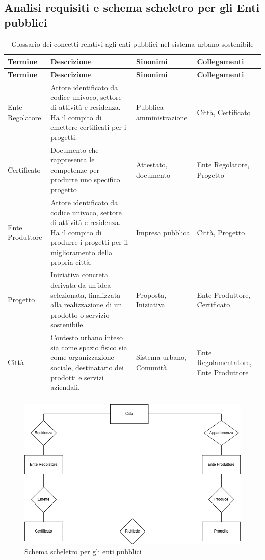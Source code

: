 \documentclass{article}
\begin{document}

\newpage
\subsection{Analisi requisiti e schema scheletro per gli Enti pubblici}

\begin{longtable}{|p{3cm}|p{6.5cm}|p{2.5cm}|p{3cm}|}
\hline
\textbf{Termine} & \textbf{Descrizione} & \textbf{Sinonimi} & \textbf{Collegamenti} \\
\hline
\endfirsthead

\hline
\textbf{Termine} & \textbf{Descrizione} & \textbf{Sinonimi} & \textbf{Collegamenti} \\
\hline
\endhead

Ente Regolatore & Attore identificato da codice univoco, settore di attività e residenza. Ha il compito di emettere certificati per i progetti. & Pubblica amministrazione & Città, Certificato \\
\hline

Certificato & Documento che rappresenta le competenze per produrre uno specifico progetto  & Attestato, documento & Ente Regolatore, Progetto \\
\hline

Ente Produttore & Attore identificato da codice univoco, settore di attività e residenza. Ha il compito di produrre i progetti per il miglioramento della propria città. & Impresa pubblica & Città, Progetto \\
\hline

Progetto & Iniziativa concreta derivata da un’idea selezionata, finalizzata alla realizzazione di un prodotto o servizio sostenibile. & Proposta, Iniziativa & Ente Produttore, Certificato \\
\hline

Città & Contesto urbano inteso sia come spazio fisico sia come organizzazione sociale, destinatario dei prodotti e servizi aziendali. & Sistema urbano, Comunità & Ente Regolamentatore, Ente Produttore \\
\hline

\caption{Glossario dei concetti relativi agli enti pubblici nel sistema urbano sostenibile}
\label{tab:glossario-enti}
\end{longtable}

\begin{figure}[H]
    \centering
    \includegraphics[width=15cm]{images/SchemaScheletroEnte.drawio}
    \caption{Schema scheletro per gli enti pubblici}
    \label{fig:schema-sostenibilita}
\end{figure}
\end{document}
